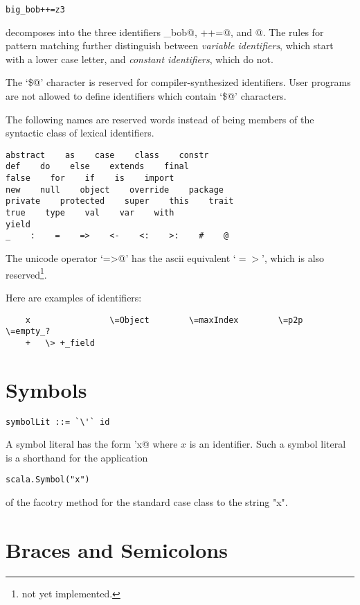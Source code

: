 \documentclass[11pt]{report}
\newcommand{\notyet}{\footnote{not yet implemented.}}
\begin{document}
\begin{verbatim}
big_bob++=z3
\end{verbatim}

decomposes into the three identifiers \verb@big_bob@, \verb@++=@, and
@.  The rules for pattern matching further distinguish between
{\em variable identifiers}, which start with a lower case letter, and
{\em constant identifiers}, which do not.


The `\verb@\$@' character is reserved for compiler-synthesized identifiers.
User programs are not allowed to define identifiers which contain `\verb@\$@'
characters.

The following names are reserved words instead of being members of the
syntactic class \verb@id@ of lexical identifiers.

\begin{verbatim}
abstract    as    case    class    constr
def    do    else    extends    final    
false    for    if    is    import
new    null    object    override    package    
private    protected    super    this    trait    
true    type    val    var    with   
yield
_    :    =    =>    <-    <:    >:    #    @
\end{verbatim}

The unicode operator `\verb@=>@' has the ascii equivalent
`$=>$', which is also reserved\notyet.

\example
Here are examples of identifiers:
\begin{verbatim}
    x                \=Object        \=maxIndex        \=p2p             \=empty_?
    +   \> +_field
\end{verbatim}

\section{Symbols}

\syntax\begin{verbatim}
symbolLit ::= `\'` id
\end{verbatim}

A symbol literal has the form \verb@'x@ where $x$ is an identifier.
Such a symbol literal is a  shorthand for the application
\begin{verbatim}
scala.Symbol("x")
\end{verbatim}
of the facotry method for the standard case class \verb@Symbol@ to the string "x".

\section{Braces and Semicolons}
\end{document}
